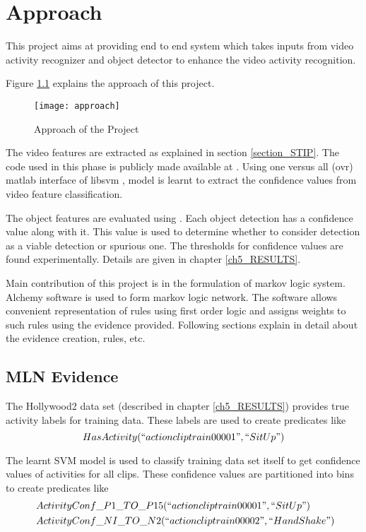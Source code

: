 \chapter{Approach}
\label{ch4_APPROACH}

This project aims at providing end to end system which takes inputs from
video activity recognizer and object detector to enhance the video activity recognition.

Figure \ref{fig:approach} explains the approach of this project.
\begin{figure}[H]
\begin{center}	
	\texttt{[image: approach]} 
\caption{Approach of the Project}
\label{fig:approach}
\end{center}
\end{figure}

The video features are extracted as explained in section \ref{section_STIP}.
The code used in this phase is publicly made available at \cite{stipCode}.
Using one versus all (ovr) matlab interface of libsvm \cite{libsvm}, model is learnt to extract the 
confidence values from video feature classification.

The object features are evaluated using \cite{voc-release4}. 
Each object detection has a confidence value along with it.
This value is used to determine whether to consider detection
as a viable detection or spurious one. The thresholds for confidence
values are found experimentally. Details are given in chapter \ref{ch5_RESULTS}.

Main contribution of this project is in the formulation of
markov logic system. Alchemy \cite{alchemy2.0} software is
used to form markov logic network. The software allows convenient
representation of rules using first order logic and assigns weights to
such rules using the evidence provided. Following sections explain in detail
about the evidence creation, rules, etc.

\section{MLN Evidence}
The Hollywood2 data set \cite{hollywood2} (described in chapter \ref{ch5_RESULTS}) provides
true activity labels for training data. These labels are used to create predicates
like
\begin{equation}
	HasActivity( ``actioncliptrain00001", ``SitUp" )
\end{equation}

The learnt SVM model is used to classify training data set itself to get
confidence values of activities for all clips. These confidence values
are partitioned into bins to create predicates like
\begin{equation}
	\begin{split}
		~ & ActivityConf\_P1\_TO\_P15(``actioncliptrain00001",``SitUp") \\
		~ & ActivityConf\_NI\_TO\_N2(``actioncliptrain00002",``HandShake")
	\end{split}
\end{equation}

